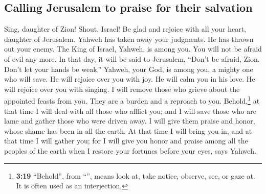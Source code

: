 \hypertarget{calling-jerusalem-to-praise-for-their-salvation}{%
\subsection{Calling Jerusalem to praise for their
salvation}\label{calling-jerusalem-to-praise-for-their-salvation}}

 Sing, daughter of Zion! Shout, Israel! Be glad and
rejoice with all your heart, daughter of Jerusalem. 
Yahweh has taken away your judgments. He has thrown out your enemy. The
King of Israel, Yahweh, is among you. You will not be afraid of evil any
more.  In that day, it will be said to Jerusalem, ``Don't
be afraid, Zion. Don't let your hands be weak.''  Yahweh,
your God, is among you, a mighty one who will save. He will rejoice over
you with joy. He will calm you in his love. He will rejoice over you
with singing.  I will remove those who grieve about the
appointed feasts from you. They are a burden and a reproach to you.
 Behold,\footnote{\textbf{3:19} ``Behold'', from
  ``'', means look at, take notice, observe, see, or gaze
  at. It is often used as an interjection.} at that time I will deal
with all those who afflict you; and I will save those who are lame and
gather those who were driven away. I will give them praise and honor,
whose shame has been in all the earth.  At that time I
will bring you in, and at that time I will gather you; for I will give
you honor and praise among all the peoples of the earth when I restore
your fortunes before your eyes, says Yahweh.
